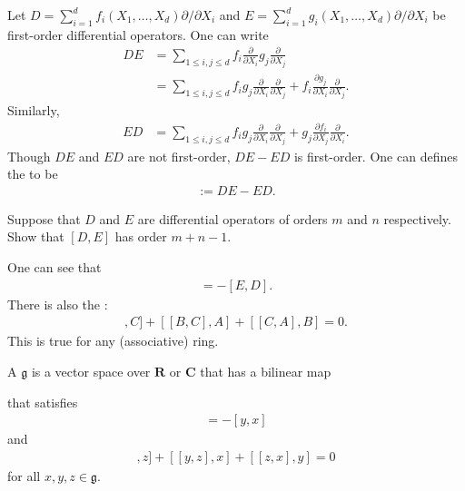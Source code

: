 \documentclass [11 pt, twoside] {article}
\begin{document}
Let $D = \sum_{i=1}^{d} f_{i}(X_1,\hdots,X_{d})\partial/\partial X_{i}$ and $E = \sum_{i=1}^{d} g_{i}(X_1,\hdots,X_{d})\partial/\partial X_{i}$ be first-order differential operators.
One can write
\begin{align*}
	D E &= \sum_{1\le i,j\le d}^{} f_{i} \frac{\partial}{\partial X_{i}} g_{j}\frac{\partial}{\partial X_{j}}\\
		 &= \sum_{1\le i,j\le d}^{} f_{i}g_{j}\frac{\partial}{\partial X_{i}}\frac{\partial}{\partial X_{j}} + f_{i}\frac{\partial g_{j}}{\partial X_{i}}\frac{\partial}{\partial X_{j}}.
\end{align*}
Similarly,
\begin{align*}
	ED &= \sum_{1\le i,j\le d}^{} f_{i}g_{j}\frac{\partial}{\partial X_{i}}\frac{\partial}{\partial X_{j}} + g_{j}\frac{\partial f_{i}}{\partial X_{j}} \frac{\partial}{\partial X_{i}}.
\end{align*}
Though $DE$ and $ED$ are not first-order, $DE-ED$ is first-order.
One can defines the  to be
\begin{align*}
	[D,E] := DE - ED.
\end{align*}

\begin{exercise}\label{}\text{}
Suppose that $D$ and $E$ are differential operators of orders $m$ and $n$ respectively.
Show that $[D,E]$ has order $m+n-1$.
\end{exercise}

One can see that 
\begin{align*}
	[D,E] = -[E,D].
\end{align*}
There is also the :
\begin{align*}
	[[A,B],C] + [[B,C],A] + [[C,A],B] = 0.
\end{align*}
This is true for any (associative) ring.

\begin{definition}[ ]\label{}\text{}
A  $\mathfrak{g}$ is a vector space over $\mathbf{R}$ or $\mathbf{C}$ that has a bilinear map 
that satisfies 
\begin{align*}
	[x,y] =- [y,x]
\end{align*}
and
\begin{align*}
	[[x,y],z] + [[y,z],x] + [[z,x],y] =0
\end{align*}
for all $x,y,z\in \mathfrak{g}$.
\end{definition}
\end{document}

